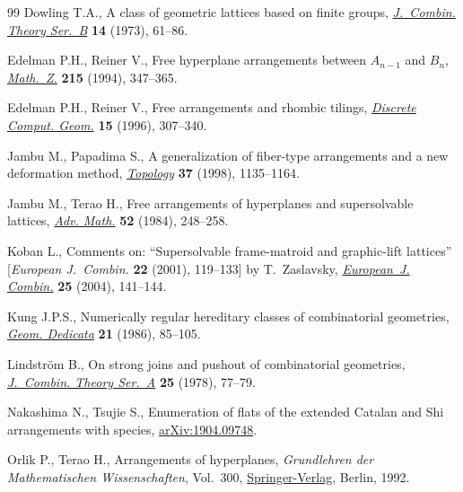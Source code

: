 \documentclass[pdftex]{sigma}
\numberwithin{equation}{section}
\begin{document}
\begin{thebibliography}{99}
Dowling T.A., A class of geometric lattices based on finite groups,
 \href{https://doi.org/10.1016/s0095-8956(73)80007-3}{\textit{J.~Combin. Theory Ser.~B}} \textbf{14} (1973), 61--86.

Edelman P.H., Reiner V., Free hyperplane arrangements between {$A_{n-1}$} and
 {$B_n$}, \href{https://doi.org/10.1007/BF02571719}{\textit{Math.~Z.}} \textbf{215} (1994), 347--365.

Edelman P.H., Reiner V., Free arrangements and rhombic tilings,
 \href{https://doi.org/10.1007/BF02711498}{\textit{Discrete Comput. Geom.}} \textbf{15} (1996), 307--340.

Jambu M., Papadima S., A generalization of fiber-type arrangements and a new
 deformation method, \href{https://doi.org/10.1016/S0040-9383(97)00092-X}{\textit{Topology}} \textbf{37} (1998), 1135--1164.

Jambu M., Terao H., Free arrangements of hyperplanes and supersolvable
 lattices, \href{https://doi.org/10.1016/0001-8708(84)90024-0}{\textit{Adv. Math.}} \textbf{52} (1984), 248--258.

Koban L., Comments on: ``{S}upersolvable frame-matroid and graphic-lift
 lattices'' [\textit{European J.~Combin.} {\bf 22} (2001), 119--133] by
 {T}.~{Z}aslavsky, \href{https://doi.org/10.1016/S0195-6698(03)00122-7}{\textit{European~J. Combin.}} \textbf{25} (2004), 141--144.

Kung J.P.S., Numerically regular hereditary classes of combinatorial
 geometries, \href{https://doi.org/10.1007/BF00147534}{\textit{Geom. Dedicata}} \textbf{21} (1986), 85--105.

Lindstr\"om B., On strong joins and pushout of combinatorial geometries,
 \href{https://doi.org/10.1016/0097-3165(78)90035-3}{\textit{J.~Combin. Theory Ser.~A}} \textbf{25} (1978), 77--79.

Nakashima N., Tsujie S., Enumeration of flats of the extended Catalan and Shi
 arrangements with species, \href{https://arxiv.org/abs/1904.09748}{arXiv:1904.09748}.

Orlik P., Terao H., Arrangements of hyperplanes, \textit{Grundlehren der
 Mathematischen Wissenschaften}, Vol.~300, \href{https://doi.org/10.1007/978-3-662-02772-1}{Springer-Verlag}, Berlin, 1992.


\end{thebibliography}
\end{document}
